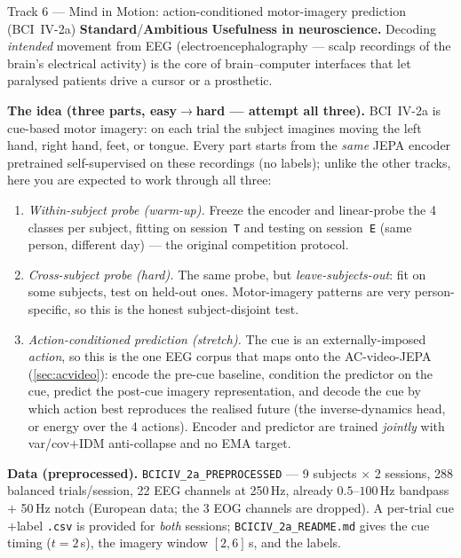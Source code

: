 \documentclass{article}
\newcommand{\code}[1]{\texttt{\small #1}}
\newcommand{\diffmed}{\colorbox{ebamber!18}{\textcolor{ebamber}{\small\bfseries Standard}}}
\newcommand{\diffhard}{\colorbox{ebred!15}{\textcolor{ebred}{\small\bfseries Ambitious}}}
\begin{document}
\begin{trackbox}{Track 6 --- Mind in Motion: action-conditioned motor-imagery prediction (BCI~IV-2a) \hfill \diffmed{}/\diffhard{}}
\textbf{Usefulness in neuroscience.} Decoding \emph{intended} movement from EEG
(electroencephalography --- scalp recordings of the brain's electrical activity) is the
core of brain--computer interfaces that let paralysed patients drive a cursor or a
prosthetic.

\smallskip
\textbf{The idea (three parts, easy$\to$hard --- attempt all three).} BCI~IV-2a is
cue-based motor imagery: on each trial the subject imagines moving the left hand, right
hand, feet, or tongue. Every part starts from the \emph{same} JEPA encoder pretrained
self-supervised on these recordings (no labels); unlike the other tracks, here you are
expected to work through all three:
\begin{enumerate}[leftmargin=1.5em,itemsep=1pt,topsep=2pt]
  \item \emph{Within-subject probe (warm-up).} Freeze the encoder and linear-probe the 4
    classes per subject, fitting on session~\code{T} and testing on session~\code{E}
    (same person, different day) --- the original competition protocol.
  \item \emph{Cross-subject probe (hard).} The same probe, but \emph{leave-subjects-out}:
    fit on some subjects, test on held-out ones. Motor-imagery patterns are very
    person-specific, so this is the honest subject-disjoint test.
  \item \emph{Action-conditioned prediction (stretch).} The cue is an
    externally-imposed \emph{action}, so this is the one EEG corpus that maps onto the
    AC-video-JEPA (\cref{sec:acvideo}): encode the pre-cue baseline, condition the
    predictor on the cue, predict the post-cue imagery representation, and decode the cue
    by which action best reproduces the realised future (the inverse-dynamics head, or
    energy over the 4 actions). Encoder and predictor are trained \emph{jointly} with
    var/cov$+$IDM anti-collapse and no EMA target.
\end{enumerate}

\smallskip
\textbf{Data (preprocessed).} \code{BCICIV\_2a\_PREPROCESSED} --- 9 subjects $\times$
2 sessions, 288 balanced trials/session, 22 EEG channels at 250\,Hz, already
$0.5$--$100$\,Hz bandpass $+$ 50\,Hz notch (European data; the 3 EOG channels are
dropped). A per-trial cue$+$label \code{.csv} is provided for \emph{both} sessions;
\code{BCICIV\_2a\_README.md} gives the cue timing ($t{=}2$\,s), the imagery window
$[2,6]$\,s, and the labels.


\end{trackbox}
\end{document}
